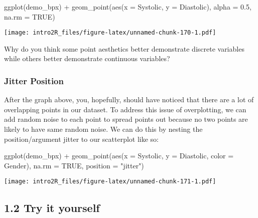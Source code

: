 \documentclass[
]{book}
\newenvironment{Shaded}{\begin{snugshade}}{\end{snugshade}}
\newcommand{\AttributeTok}[1]{\textcolor[rgb]{0.77,0.63,0.00}{#1}}
\newcommand{\ConstantTok}[1]{\textcolor[rgb]{0.00,0.00,0.00}{#1}}
\newcommand{\FloatTok}[1]{\textcolor[rgb]{0.00,0.00,0.81}{#1}}
\newcommand{\FunctionTok}[1]{\textcolor[rgb]{0.00,0.00,0.00}{#1}}
\newcommand{\NormalTok}[1]{#1}
\newcommand{\SpecialCharTok}[1]{\textcolor[rgb]{0.00,0.00,0.00}{#1}}
\newcommand{\StringTok}[1]{\textcolor[rgb]{0.31,0.60,0.02}{#1}}
\begin{document}
\begin{Shaded}
\begin{Highlighting}[]
\FunctionTok{ggplot}\NormalTok{(demo\_bpx) }\SpecialCharTok{+}
  \FunctionTok{geom\_point}\NormalTok{(}\FunctionTok{aes}\NormalTok{(}\AttributeTok{x =}\NormalTok{ Systolic, }\AttributeTok{y =}\NormalTok{ Diastolic),}
             \AttributeTok{alpha =} \FloatTok{0.5}\NormalTok{,}
             \AttributeTok{na.rm =} \ConstantTok{TRUE}\NormalTok{)}
\end{Highlighting}
\end{Shaded}

\texttt{[image: intro2R\_files/figure-latex/unnamed-chunk-170-1.pdf]}

Why do you think some point aesthetics better demonstrate discrete variables while others better demonstrate continuous variables?

\hypertarget{jitter-position}{%
\subsubsection{Jitter Position}\label{jitter-position}}

After the graph above, you, hopefully, should have noticed that there are a lot of overlapping points in our dataset. To address this issue of overplotting, we can add random noise to each point to spread points out because no two points are likely to have same random noise. We can do this by nesting the position/argument jitter to our scatterplot like so:

\begin{Shaded}
\begin{Highlighting}[]
\FunctionTok{ggplot}\NormalTok{(demo\_bpx) }\SpecialCharTok{+}
  \FunctionTok{geom\_point}\NormalTok{(}\FunctionTok{aes}\NormalTok{(}\AttributeTok{x =}\NormalTok{ Systolic, }
                 \AttributeTok{y =}\NormalTok{ Diastolic, }
                 \AttributeTok{color =}\NormalTok{ Gender), }
             \AttributeTok{na.rm =} \ConstantTok{TRUE}\NormalTok{,}
             \AttributeTok{position =} \StringTok{"jitter"}\NormalTok{)}
\end{Highlighting}
\end{Shaded}

\texttt{[image: intro2R\_files/figure-latex/unnamed-chunk-171-1.pdf]}

\hypertarget{try-it-yourself-24}{%
\subsection{1.2 Try it yourself}\label{try-it-yourself-24}}
\end{document}
